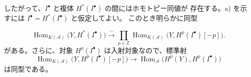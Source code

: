 したがって、$I^\bullet$ と複体 $H^*(I^\bullet)$ の間にはホモトピー同値が
存在する。a) を示すには $I^\bullet=H^*(I^\bullet)$ と仮定してよい。
このとき明らかに同型

\[
\operatorname{Hom}_{K(\mathcal A)}\bigl(Y,H^*(I^\bullet)\bigr)
\xrightarrow{\sim}
\prod_{p\in\mathbb Z}
\operatorname{Hom}_{K(\mathcal A)}
\bigl(Y,H^p(I^\bullet)[-p]\bigr).
\]
がある。さらに、対象 $H^p(I^\bullet)$ は入射対象なので、標準射
\[
\operatorname{Hom}_{K(\mathcal A)}
\bigl(Y,H^p(I^\bullet)[-p]\bigr)
\longrightarrow
\operatorname{Hom}_{\mathcal A}\bigl(H^p(Y),H^p(I^\bullet)\bigr)
\]
は同型である。
\endgroup
